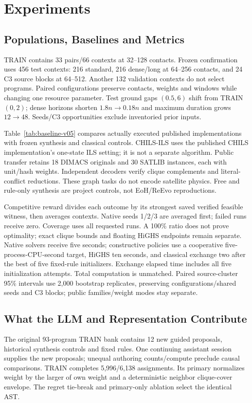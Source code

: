 \section{Experiments}
\label{sec:experiments}

\subsection{Populations, Baselines and Metrics}
\label{sec:experiments:protocol}
TRAIN contains 33 pairs/66 contexts at 32--128 contacts. Frozen confirmation
uses 456 test contexts: 216 standard, 216 dense/long at 64--256 contacts,
and 24 C3 source blocks at 64--512. Another 132 validation contexts do not
select programs. Paired configurations preserve contacts, weights and windows
while changing one resource parameter. Test ground gaps $(0.5,6)$ shift from
TRAIN $(0,2)$; dense horizons shorten $1.8n\to0.18n$ and maximum duration
grows $12\to48$. Seeds/C3 opportunities exclude inventoried prior inputs.

Table~\ref{tab:baseline-v05} compares actually executed published implementations
with frozen synthesis and classical controls. CHILS-ILS uses the published
CHILS implementation's one-state ILS setting; it is not a separate algorithm.
Public transfer retains 18 DIMACS originals and 30 SATLIB instances,
each with unit/hash weights. Independent decoders verify clique complements
and literal-conflict reductions. These graph tasks do not encode satellite physics.
Free and rule-only synthesis are project controls, not EoH/ReEvo reproductions.

Competitive reward divides each outcome by its strongest saved verified feasible
witness, then averages contexts. Native seeds 1/2/3 are averaged first; failed
runs receive zero. Coverage uses all requested runs. A 100\% ratio does not
prove optimality; exact clique bounds and floating HiGHS endpoints remain separate.
Native solvers receive five seconds; constructive policies use a cooperative
five-process-CPU-second target, HiGHS ten seconds, and classical exchange two
after the best of five fixed-rule initializers. Exchange elapsed time includes
all five initialization attempts. Total computation is unmatched.
Paired source-cluster 95\% intervals use 2,000 bootstrap replicates, preserving
configurations/shared seeds and C3 blocks; public families/weight modes stay separate.



\subsection{What the LLM and Representation Contribute}
\label{sec:experiments:selection}
The original 93-program TRAIN bank contains 12 new guided proposals,
historical synthesis controls and fixed rules. One continuing assistant
session supplies the new proposals; unequal authoring counts/compute preclude
causal comparisons. TRAIN completes 5,996/6,138 assignments. Its primary normalizes weight
by the larger of own weight and a deterministic neighbor clique-cover envelope.
The regret tie-break and primary-only ablation select the identical AST.

